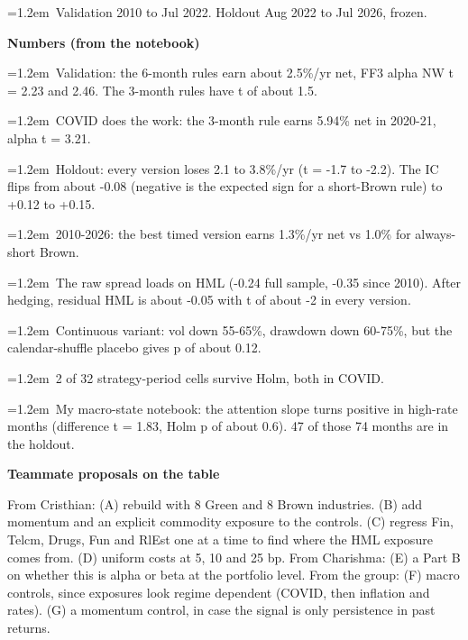 \par\hangindent=1.2em\noindent\textbullet~Validation 2010 to Jul 2022. Holdout Aug 2022 to Jul 2026, frozen.
\medskip
\par\textbf{Numbers (from the notebook)}
\par\hangindent=1.2em\noindent\textbullet~Validation: the 6-month rules earn about 2.5\%/yr net, FF3 alpha NW t = 2.23 and 2.46. The 3-month rules have t of about 1.5.
\par\hangindent=1.2em\noindent\textbullet~COVID does the work: the 3-month rule earns 5.94\% net in 2020-21, alpha t = 3.21.
\par\hangindent=1.2em\noindent\textbullet~Holdout: every version loses 2.1 to 3.8\%/yr (t = -1.7 to -2.2). The IC flips from about -0.08 (negative is the expected sign for a short-Brown rule) to +0.12 to +0.15.
\par\hangindent=1.2em\noindent\textbullet~2010-2026: the best timed version earns 1.3\%/yr net vs 1.0\% for always-short Brown.
\par\hangindent=1.2em\noindent\textbullet~The raw spread loads on HML (-0.24 full sample, -0.35 since 2010). After hedging, residual HML is about -0.05 with t of about -2 in every version.
\par\hangindent=1.2em\noindent\textbullet~Continuous variant: vol down 55-65\%, drawdown down 60-75\%, but the calendar-shuffle placebo gives p of about 0.12.
\par\hangindent=1.2em\noindent\textbullet~2 of 32 strategy-period cells survive Holm, both in COVID.
\par\hangindent=1.2em\noindent\textbullet~My macro-state notebook: the attention slope turns positive in high-rate months (difference t = 1.83, Holm p of about 0.6). 47 of those 74 months are in the holdout.
\medskip
\par\textbf{Teammate proposals on the table}
\par\noindent From Cristhian: (A) rebuild with 8 Green and 8 Brown industries. (B) add momentum and an explicit commodity exposure to the controls. (C) regress Fin, Telcm, Drugs, Fun and RlEst one at a time to find where the HML exposure comes from. (D) uniform costs at 5, 10 and 25 bp. From Charishma: (E) a Part B on whether this is alpha or beta at the portfolio level. From the group: (F) macro controls, since exposures look regime dependent (COVID, then inflation and rates). (G) a momentum control, in case the signal is only persistence in past returns.
